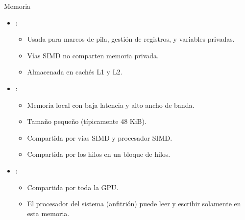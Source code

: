 \begin{frame}[t]{Memoria}
\begin{itemize}
  \item {}:
    \begin{itemize}
      \item Usada para marcos de pila, gestión de registros, y variables privadas.
      \item Vías SIMD no comparten memoria privada.
      \item Almacenada en cachés L1 y L2.
    \end{itemize}

  \item {}:
    \begin{itemize}
      \item Memoria local con baja latencia y alto ancho de banda.
      \item Tamaño pequeño (típicamente 48 KiB).
      \item Compartida por vías SIMD y procesador SIMD.
      \item Compartida por los hilos en un bloque de hilos.
    \end{itemize}

  \item {}:
    \begin{itemize}
      \item Compartida por toda la GPU.
      \item El procesador del sistema (anfitrión) puede leer y escribir solamente
            en esta memoria.
    \end{itemize}
\end{itemize}
\end{frame}
